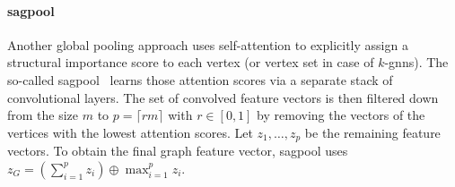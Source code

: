 \paragraph{\acs*{sagpool}}
Another global pooling approach uses self-attention to explicitly assign a structural importance score to each vertex (or vertex set in case of $k$-\acp{gnn}).
The so-called \ac{sagpool}~\cite{Lee2019} learns those attention scores via a separate stack of convolutional layers.
The set of convolved feature vectors is then filtered down from the size $m$ to $p = \lceil r m \rceil$ with $r \in [0, 1]$ by removing the vectors of the vertices with the lowest attention scores.
Let $z_1, \dots, z_p$ be the remaining feature vectors.
To obtain the final graph feature vector, \ac{sagpool} uses $z_G = {\left( \sum_{i=1}^{p} z_i \right)} \oplus {\max_{i=1}^p {z_i}}$.
